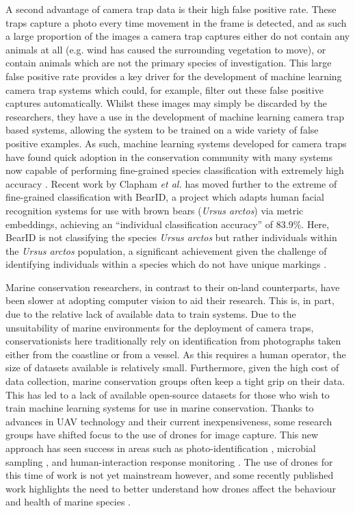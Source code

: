  A second advantage of camera trap data is their high false positive rate. These traps capture a photo every time movement in the frame is detected, and as such a large proportion of the images a camera trap captures either do not contain any animals at all (e.g. wind has caused the surrounding vegetation to move), or contain animals which are not the primary species of investigation. This large false positive rate provides a key driver for the development of machine learning camera trap systems which could, for example, filter out these false positive captures automatically. Whilst these images may simply be discarded by the researchers, they have a use in the development of machine learning camera trap based systems, allowing the system to be trained on a wide variety of false positive examples. As such, machine learning systems developed for camera traps have found quick adoption in the conservation community with many systems now capable of performing fine-grained species classification with extremely high accuracy \cite{tabak_machine_2019, norouzzadeh_automatically_2018, willi_identifying_2019, beery_efficient_2019, norouzzadeh_deep_2019}. Recent work by Clapham \textit{et al.} has moved further to the extreme of fine-grained classification with BearID, a project which adapts human facial recognition systems for use with brown bears (\textit{Ursus arctos}) via metric embeddings, achieving an ``individual classification accuracy'' of 83.9\%. Here, BearID is not classifying the species \textit{Ursus arctos} but rather individuals within the \textit{Ursus arctos} population, a significant achievement given the challenge of identifying individuals within a species which do not have unique markings \cite{rowcliffe_estimating_2008}.

Marine conservation researchers, in contrast to their on-land counterparts, have been slower at adopting computer vision to aid their research. This is, in part, due to the relative lack of available data to train systems. Due to the unsuitability of marine environments for the deployment of camera traps, conservationists here traditionally rely on identification from photographs taken either from the coastline or from a vessel. As this requires a human operator, the size of datasets available is relatively small. Furthermore, given the high cost of data collection, marine conservation groups often keep a tight grip on their data. This has led to a lack of available open-source datasets for those who wish to train machine learning systems for use in marine conservation. Thanks to advances in UAV technology and their current inexpensiveness, some research groups have shifted focus to the use of drones for image capture. This new approach has seen success in areas such as photo-identification \cite{bogucki_applying_2019, gray_drones_2019}, microbial sampling \cite{centelleghe_use_2020}, and human-interaction response monitoring \cite{fiori_using_2020}. The use of drones for this time of work is not yet mainstream however, and some recently published work highlights the need to better understand how drones affect the behaviour and health of marine species \cite{giles_responses_2020, bevan_measuring_2018, ramos_bottlenose_2018, pomeroy_assessing_2015}. 

